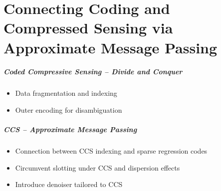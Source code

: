 
\part{Connecting Coding and \newline
Compressed Sensing via \newline
Approximate Message Passing}
\frame{\partpage}


\begin{frame}
\frametitle{Coded Compressive Sensing -- Divide and Conquer}
\begin{center}

\end{center}
\begin{itemize}
\item Data fragmentation and indexing
\item Outer encoding for disambiguation
\end{itemize}
\end{frame}


\begin{frame}
\frametitle{CCS -- Approximate Message Passing}
\begin{center}
\end{center}
  \begin{itemize}
  \item Connection between CCS indexing and sparse regression codes
  \item Circumvent slotting under CCS and dispersion effects
  \item Introduce denoiser tailored to CCS
  \end{itemize}
\end{frame}

